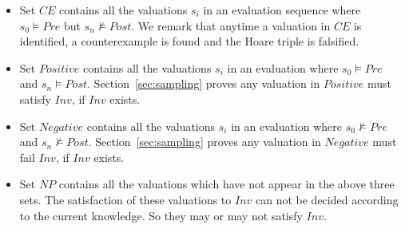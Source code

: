 \begin{itemize}
    \item Set $\mathit{CE}$ contains all the valuations $s_i$ in an evaluation sequence where $\mathit{s_0 \models \mathit{Pre}}$ but $\mathit{s_n \not\models \mathit{Post}}$. We remark that anytime a valuation in $\mathit{CE}$ is identified, a counterexample is found and the Hoare triple is falsified.
    \item Set $\mathit{Positive}$ contains all the valuations $s_i$ in an evaluation where $\mathit{s_0 \models \mathit{Pre}}$ and $\mathit{s_n \models \mathit{Post}}$. Section~\ref{sec:sampling} proves any valuation in $\mathit{Positive}$ must satisfy $\mathit{Inv}$, if $\mathit{Inv}$ exists.
    \item Set $\mathit{Negative}$ contains all the valuations $s_i$ in an evaluation where $\mathit{s_0 \not\models \mathit{Pre}}$ and $\mathit{s_n \not\models \mathit{Post}}$. Section~\ref{sec:sampling} proves any valuation in $\mathit{Negative}$ must fail $\mathit{Inv}$, if $\mathit{Inv}$ exists.
    \item Set $\mathit{NP}$ contains all the valuations which have not appear in the above three sets. The satisfaction of these valuations to $\mathit{Inv}$ can not be decided according to the current knowledge. So they may or may not satisfy $\mathit{Inv}$.
\end{itemize}
